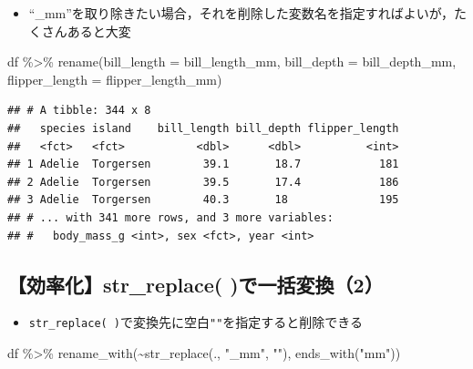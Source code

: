 \documentclass[
  xelatex,ja=standard, b5paper]{bxjsbook}
\newenvironment{Shaded}{\begin{snugshade}}{\end{snugshade}}
\newcommand{\AttributeTok}[1]{\textcolor[rgb]{0.77,0.63,0.00}{#1}}
\newcommand{\FunctionTok}[1]{\textcolor[rgb]{0.00,0.00,0.00}{#1}}
\newcommand{\NormalTok}[1]{#1}
\newcommand{\SpecialCharTok}[1]{\textcolor[rgb]{0.00,0.00,0.00}{#1}}
\newcommand{\StringTok}[1]{\textcolor[rgb]{0.31,0.60,0.02}{#1}}
\providecommand{\tightlist}{%
  \setlength{\itemsep}{0pt}\setlength{\parskip}{0pt}}
\begin{document}
\begin{itemize}
\tightlist
\item
  ``\_mm''を取り除きたい場合，それを削除した変数名を指定すればよいが，たくさんあると大変
\end{itemize}

\begin{Shaded}
\begin{Highlighting}[]
\NormalTok{df }\SpecialCharTok{\%\textgreater{}\%} 
  \FunctionTok{rename}\NormalTok{(}\AttributeTok{bill\_length =}\NormalTok{ bill\_length\_mm,}
         \AttributeTok{bill\_depth  =}\NormalTok{ bill\_depth\_mm,}
         \AttributeTok{flipper\_length =}\NormalTok{ flipper\_length\_mm)}
\end{Highlighting}
\end{Shaded}

\begin{verbatim}
## # A tibble: 344 x 8
##   species island    bill_length bill_depth flipper_length
##   <fct>   <fct>           <dbl>      <dbl>          <int>
## 1 Adelie  Torgersen        39.1       18.7            181
## 2 Adelie  Torgersen        39.5       17.4            186
## 3 Adelie  Torgersen        40.3       18              195
## # ... with 341 more rows, and 3 more variables:
## #   body_mass_g <int>, sex <fct>, year <int>
\end{verbatim}

\hypertarget{rename-strreplace2}{%
\subsection{【効率化】str\_replace( )で一括変換（2）}\label{rename-strreplace2}}

\begin{itemize}
\tightlist
\item
  \texttt{str\_replace(\ )}で変換先に空白\texttt{""}を指定すると削除できる
\end{itemize}

\begin{Shaded}
\begin{Highlighting}[]
\NormalTok{df }\SpecialCharTok{\%\textgreater{}\%} 
  \FunctionTok{rename\_with}\NormalTok{(}\SpecialCharTok{\textasciitilde{}}\FunctionTok{str\_replace}\NormalTok{(., }\StringTok{"\_mm"}\NormalTok{, }\StringTok{""}\NormalTok{),}
              \FunctionTok{ends\_with}\NormalTok{(}\StringTok{"mm"}\NormalTok{))}
\end{Highlighting}
\end{Shaded}
\end{document}
